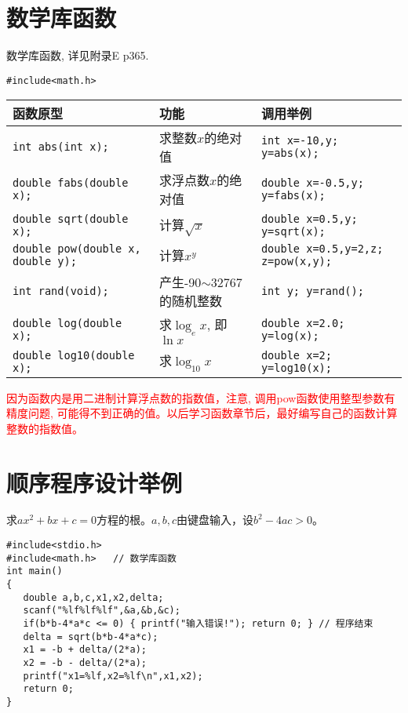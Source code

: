 \section{数学库函数}

\begin{frame}[fragile]{数学库函数, 详见附录E p365.}
\begin{lstlisting}
#include<math.h>
\end{lstlisting}
\resizebox{\textwidth}{!} {
\begin{tabular}{|l|l|l|}
	\hline
	函数原型 & 功能 & 调用举例\\
	\hline
	\lstinline|int abs(int x);| & 求整数$x$的绝对值 & \lstinline|int x=-10,y; y=abs(x);|\\ 
	\hline 
    \lstinline|double fabs(double x);| &求浮点数$x$的绝对值 & \lstinline|double x=-0.5,y; y=fabs(x);| \\ 
	\hline 
	\lstinline|double sqrt(double x);| &计算$\sqrt{x}$ & \lstinline|double x=0.5,y; y=sqrt(x);|\\ 
	\hline 
    \lstinline|double pow(double x, double y);| &计算$x^y$ & \lstinline|double x=0.5,y=2,z; z=pow(x,y);|\\ 
	\hline 
	\lstinline|int rand(void);| &产生-90$\sim$32767的随机整数 & \lstinline|int y; y=rand();|\\
	\hline 
	\lstinline|double log(double x);| &求$\log_e x$, 即$\ln x$ & \lstinline|double x=2.0; y=log(x);| \\
	\hline 
	\lstinline|double log10(double x);| &求$\log_{10} x$ &\lstinline|double x=2; y=log10(x);|\\ 
	\hline  
\end{tabular} 
}
\medskip

\textcolor{red}{因为函数内是用二进制计算浮点数的指数值，注意, 调用pow函数使用整型参数有精度问题, 可能得不到正确的值。以后学习函数章节后，最好编写自己的函数计算整数的指数值。}
\end{frame}

\section{顺序程序设计举例}

\begin{frame}[fragile]
\begin{example}[例3.5 p64]
	求$ax^2+bx+c=0$方程的根。$a,b,c$由键盘输入，设$b^2-4ac>0$。
\end{example}
\begin{lstlisting}
#include<stdio.h>
#include<math.h>   // 数学库函数        
int main()                   
{                            
   double a,b,c,x1,x2,delta;
   scanf("%lf%lf%lf",&a,&b,&c);
   if(b*b-4*a*c <= 0) { printf("输入错误!"); return 0; } // 程序结束
   delta = sqrt(b*b-4*a*c);
   x1 = -b + delta/(2*a);
   x2 = -b - delta/(2*a);
   printf("x1=%lf,x2=%lf\n",x1,x2);
   return 0;           
}                            
\end{lstlisting}
\end{frame}

